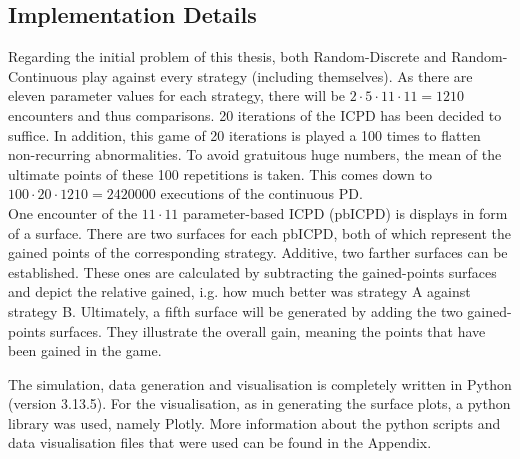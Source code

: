 \documentclass{article}
\begin{document}
\subsection{Implementation Details}

Regarding the initial problem of this thesis, both Random-Discrete and Random-Continuous play against every strategy (including themselves).
As there are eleven parameter values for each strategy, there will be $2 \cdot 5 \cdot 11 \cdot 11 = 1210$ encounters and thus comparisons.
20 iterations of the ICPD has been decided to suffice.
In addition, this game of 20 iterations is played a 100 times to flatten non-recurring abnormalities.
To avoid gratuitous huge numbers, the mean of the ultimate points of these 100 repetitions is taken.
This comes down to $100 \cdot 20 \cdot 1210 = 2420000$ executions of the continuous PD.\\

One encounter of the $11 \cdot 11$ parameter-based ICPD (pbICPD) is displays in form of a surface.
There are two surfaces for each pbICPD, both of which represent the gained points of the corresponding strategy.
Additive, two farther surfaces can be established.
These ones are calculated by subtracting the gained-points surfaces and depict the relative gained, i.g. how much better was strategy A against strategy B.
Ultimately, a fifth surface will be generated by adding the two gained-points surfaces.
They illustrate the overall gain, meaning the points that have been gained in the game.


The simulation, data generation and visualisation is completely written in Python (version 3.13.5).
For the visualisation, as in generating the surface plots, a python library was used, namely Plotly.
More information about the python scripts and data visualisation files that were used can be found in the Appendix.

	
\end{document}
